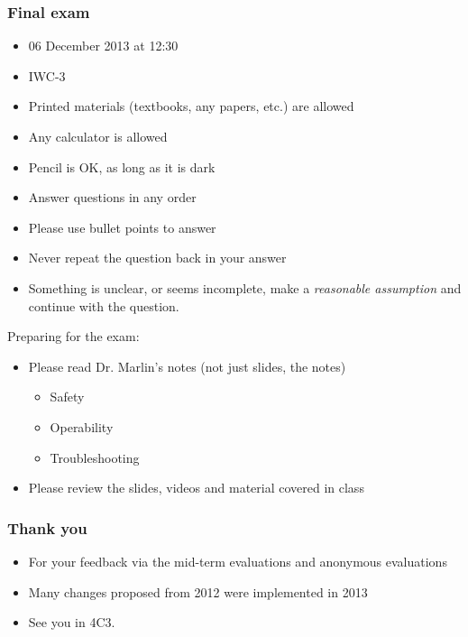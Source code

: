 \begin{frame}\frametitle{Final exam}
	\begin{itemize}
		\item	06 December 2013 at 12:30
		\item	IWC-3
		\item	Printed materials (textbooks, any papers, etc.) are allowed
		\item	Any calculator is allowed
		\item	Pencil is OK, as long as it is dark
		\item	Answer questions in any order
		\item	Please use bullet points to answer
		\item	Never repeat the question back in your answer
		\item	Something is unclear, or seems incomplete, make a \emph{reasonable assumption} and continue with the question.
	\end{itemize}
	\vspace{12pt}
	Preparing for the exam:
	\begin{itemize}
		\item	Please read Dr. Marlin's notes (not just slides, the notes)
		\begin{itemize}
			\item	Safety
			\item	Operability
			\item	Troubleshooting
		\end{itemize}
		\item	Please review the slides, videos and material covered in class
	\end{itemize}
\end{frame}

\begin{frame}\frametitle{Thank you}
	\begin{itemize}
		\item	For your feedback via the mid-term evaluations and anonymous evaluations
		\item	Many changes proposed from 2012 were implemented in 2013
		\item	{See you in 4C3.}
	\end{itemize}
\end{frame}

\begin{frame}\frametitle{}
	\begin{exampleblock}{}
		\begin{center}\huge {}
		\end{center}
	\end{exampleblock}
\end{frame}